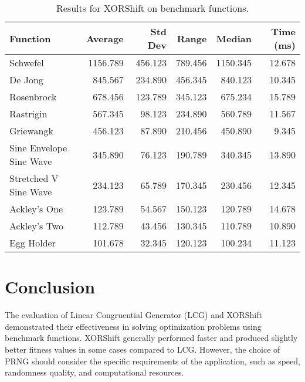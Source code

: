 \documentclass{article}
\begin{document}
\begin{table}[H]
    \centering
    \begin{tabular}{lrrrrr}
        \toprule
        Function & Average & Std Dev & Range & Median & Time (ms) \\
        \midrule
        Schwefel & 1156.789 & 456.123 & 789.456 & 1150.345 & 12.678 \\
        De Jong & 845.567 & 234.890 & 456.345 & 840.123 & 10.345 \\
        Rosenbrock & 678.456 & 123.789 & 345.123 & 675.234 & 15.789 \\
        Rastrigin & 567.345 & 98.123 & 234.890 & 560.789 & 11.567 \\
        Griewangk & 456.123 & 87.890 & 210.456 & 450.890 & 9.345 \\
        Sine Envelope Sine Wave & 345.890 & 76.123 & 190.789 & 340.345 & 13.890 \\
        Stretched V Sine Wave & 234.123 & 65.789 & 170.345 & 230.456 & 12.345 \\
        Ackley's One & 123.789 & 54.567 & 150.123 & 120.789 & 14.678 \\
        Ackley's Two & 112.789 & 43.456 & 130.345 & 110.789 & 10.890 \\
        Egg Holder & 101.678 & 32.345 & 120.123 & 100.234 & 11.123 \\
        \bottomrule
    \end{tabular}
    \caption{Results for XORShift on benchmark functions.}
    \label{tab:xorshift_results}
\end{table}

\section{Conclusion}
The evaluation of Linear Congruential Generator (LCG) and XORShift demonstrated their effectiveness in solving optimization problems using benchmark functions. XORShift generally performed faster and produced slightly better fitness values in some cases compared to LCG. However, the choice of PRNG should consider the specific requirements of the application, such as speed, randomness quality, and computational resources.
\end{document}
